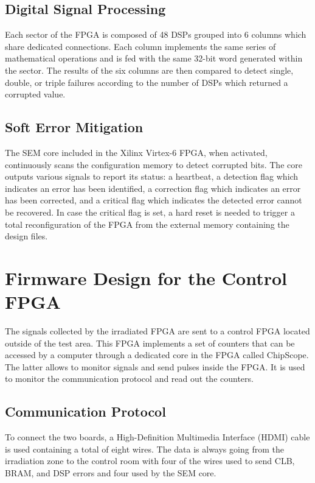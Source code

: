     \subsection{Digital Signal Processing}

      Each sector of the FPGA is composed of 48 DSPs grouped into 6 columns which share dedicated connections. Each column implements the same series of mathematical operations and is fed with the same 32-bit word generated within the sector. The results of the six columns are then compared to detect single, double, or triple failures according to the number of DSPs which returned a corrupted value.

    \subsection{Soft Error Mitigation}

      The SEM core included in the Xilinx Virtex-6 FPGA, when activated, continuously scans the configuration memory to detect corrupted bits. The core outputs various signals to report its status: a heartbeat, a detection flag which indicates an error has been identified, a correction flag which indicates an error has been corrected, and a critical flag which indicates the detected error cannot be recovered. In case the critical flag is set, a hard reset is needed to trigger a total reconfiguration of the FPGA from the external memory containing the design files.

  \section{Firmware Design for the Control FPGA}

    The signals collected by the irradiated FPGA are sent to a control FPGA located outside of the test area. This FPGA implements a set of counters that can be accessed by a computer through a dedicated core in the FPGA called ChipScope. The latter allows to monitor signals and send pulses inside the FPGA. It is used to monitor the communication protocol and read out the counters.

    \subsection{Communication Protocol}

      To connect the two boards, a High-Definition Multimedia Interface (HDMI) cable is used containing a total of eight wires. The data is always going from the irradiation zone to the control room with four of the wires used to send CLB, BRAM, and DSP errors and four used by the SEM core. \\

